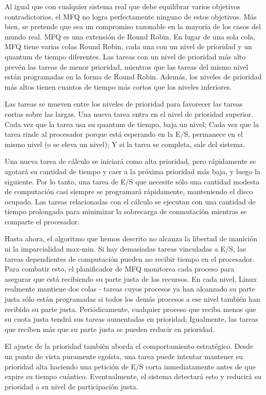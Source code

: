\documentclass[10pt]{book}
\begin{document}
Al igual que con cualquier sistema real que debe equilibrar varios objetivos contradictorios, el MFQ no logra perfectamente ninguno de estos objetivos. Más bien, se pretende que sea un compromiso razonable en la mayoría de los casos del mundo real. MFQ es una extensión de Round Robin. En lugar de una sola cola, MFQ tiene varias colas Round Robin, cada una con un nivel de prioridad y un quantum de tiempo diferentes. Las tareas con un nivel de prioridad más alto prevén las tareas de menor prioridad, mientras que las tareas del mismo nivel están programadas en la forma de Round Robin. Además, los niveles de prioridad más altos tienen cuantos de tiempo más cortos que los niveles inferiores.

Las tareas se mueven entre los niveles de prioridad para favorecer las tareas cortas sobre las largas. Una nueva tarea entra en el nivel de prioridad superior. Cada vez que la tarea usa su quantum de tiempo, baja un nivel; Cada vez que la tarea rinde al procesador porque está esperando en la E/S, permanece en el mismo nivel (o se eleva un nivel); Y si la tarea se completa, sale del sistema.

Una nueva tarea de cálculo se iniciará como alta prioridad, pero rápidamente se agotará su cantidad de tiempo y caer a la próxima prioridad más baja, y luego la siguiente. Por lo tanto, una tarea de E/S que necesite sólo una cantidad modesta de computación casi siempre se programará rápidamente, manteniendo el disco ocupado. Las tareas relacionadas con el cálculo se ejecutan con una cantidad de tiempo prolongada para minimizar la sobrecarga de conmutación mientras se comparte el procesador.

Hasta ahora, el algoritmo que hemos descrito no alcanza la libertad de inanición ni la imparcialidad max-min. Si hay demasiadas tareas vinculadas a E/S, las tareas dependientes de computación pueden no recibir tiempo en el procesador. Para combatir esto, el planificador de MFQ monitorea cada proceso para asegurar que está recibiendo su parte justa de los recursos. En cada nivel, Linux realmente mantiene dos colas - tareas cuyos procesos ya han alcanzado su parte justa sólo están programadas si todos los demás procesos a ese nivel también han recibido su parte justa. Periódicamente, cualquier proceso que reciba menos que su cuota justa tendrá sus tareas aumentadas en prioridad; Igualmente, las tareas que reciben más que su parte justa se pueden reducir en prioridad.

El ajuste de la prioridad también aborda el comportamiento estratégico. Desde un punto de vista puramente egoísta, una tarea puede intentar mantener su prioridad alta haciendo una petición de E/S corta inmediatamente antes de que expire su tiempo cuántico. Eventualmente, el sistema detectará esto y reducirá su prioridad a su nivel de participación justa.
\end{document}
